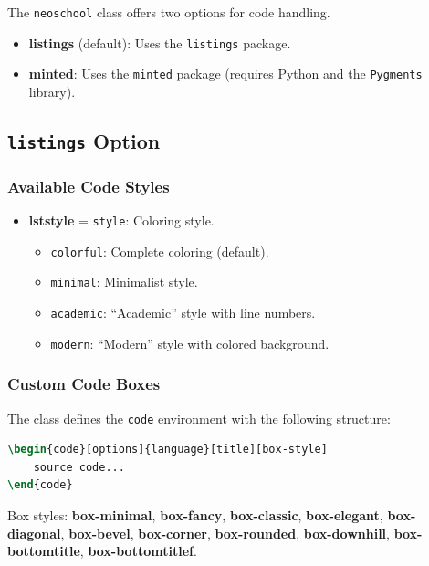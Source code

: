 \documentclass[
    margin=2cm
]{neoschool}
\begin{document}
The \texttt{neoschool} class offers two options for
code handling.

\begin{itemize}
\item
  \textbf{listings} (default): Uses the
  \texttt{listings} package.
\item
  \textbf{minted}: Uses the \texttt{minted} package
  (requires Python and the \texttt{Pygments} library).
\end{itemize}

\subsection{\texttt{listings} Option}

\subsubsection{Available Code Styles}

\begin{itemize}
\item
  \textbf{lststyle} = \texttt{style}: Coloring style.

  \begin{itemize}
    \item
    \texttt{colorful}: Complete coloring (default).
  \item
    \texttt{minimal}: Minimalist style.
  \item
    \texttt{academic}: ``Academic'' style with line
    numbers.
  \item
    \texttt{modern}: ``Modern'' style with colored
    background.
  \end{itemize}
\end{itemize}

\subsubsection{Custom Code Boxes}

The class defines the \texttt{code} environment with
the following structure:

\begin{lstlisting}[language=TeX]
\begin{code}[options]{language}[title][box-style]
    source code...
\end{code}
\end{lstlisting}

Box styles: \textbf{box-minimal}, \textbf{box-fancy},
\textbf{box-classic}, \textbf{box-elegant}, \textbf{box-diagonal},
\textbf{box-bevel}, \textbf{box-corner}, \textbf{box-rounded},
\textbf{box-downhill}, \textbf{box-bottomtitle},
\textbf{box-bottomtitlef}.
\end{document}
